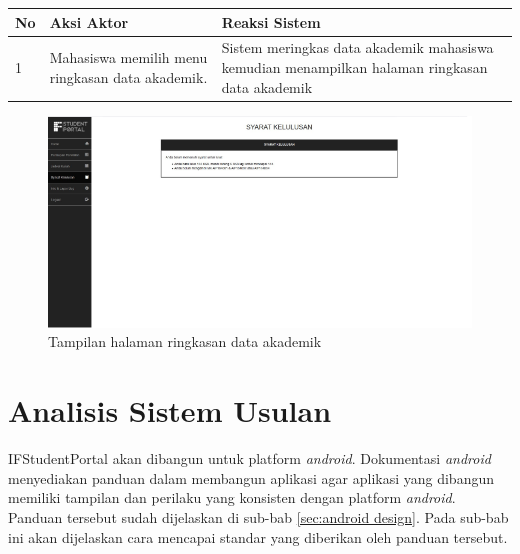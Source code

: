 \begin{enumerate}
\begin{itemize}
			\begin{tabular}{|p{0.5cm} |p{6cm}| p{6cm}|}
						\hline
							No 	& Aksi Aktor & Reaksi Sistem \\ \hline
							1 	& Mahasiswa memilih menu ringkasan data akademik. 	&	Sistem meringkas data akademik mahasiswa kemudian menampilkan halaman ringkasan data akademik \\ \hline 
						\end{tabular} 
		\end{itemize}
		\begin{figure}[H]
				\centering
				\includegraphics[scale=0.7]{Gambar/ringkasan}
				\caption{Tampilan halaman ringkasan data akademik} 
				\label{fig:ifstudpor_ringkasan}
			\end{figure}
\end{enumerate}


\section{Analisis Sistem Usulan}
IFStudentPortal akan dibangun untuk platform \textit{android}. Dokumentasi \textit{android} menyediakan panduan dalam membangun aplikasi agar aplikasi yang dibangun memiliki tampilan dan perilaku yang konsisten dengan platform \textit{android}. Panduan tersebut sudah dijelaskan di sub-bab \ref{sec:android design}. Pada sub-bab ini akan dijelaskan cara mencapai standar yang diberikan oleh panduan tersebut.

